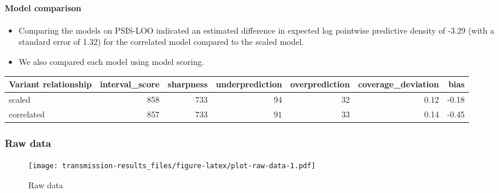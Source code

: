 \documentclass[
]{article}
\providecommand{\tightlist}{%
  \setlength{\itemsep}{0pt}\setlength{\parskip}{0pt}}
\begin{document}
\hypertarget{model-comparison}{%
\paragraph*{Model comparison}\label{model-comparison}}

\begin{itemize}
\tightlist
\item
  Comparing the models on PSIS-LOO indicated an estimated difference in expected log pointwise predictive density of -3.29 (with a standard error of 1.32) for the correlated model compared to the scaled model.
\item
  We also compared each model using model scoring.
\end{itemize}

\begin{tabular}{l|r|r|r|r|r|r}
\hline
Variant relationship & interval\_score & sharpness & underprediction & overprediction & coverage\_deviation & bias\\
\hline
scaled & 858 & 733 & 94 & 32 & 0.12 & -0.18\\
\hline
correlated & 857 & 733 & 91 & 33 & 0.14 & -0.45\\
\hline
\end{tabular}
\newpage

\hypertarget{raw-data}{%
\subsubsection*{Raw data}\label{raw-data}}

\begin{figure}
\centering
\texttt{[image: transmission-results\_files/figure-latex/plot-raw-data-1.pdf]}
\caption{\label{fig:plot-raw-data}Raw data}
\end{figure}
\end{document}
